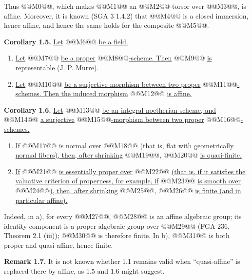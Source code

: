 Thus @@M0@@, which makes @@M1@@ an @@M2@@-torsor over @@M3@@, is affine. Moreover, it is known (SGA 3 1.4.2) that @@M4@@ is a closed immersion, hence affine, and hence the same holds for the composite @@M5@@.

\textbf{Corollary 1.5.} \uline{Let} @@M6@@ \uline{be a field.}
\begin{enumerate}[label=\alph*)]
\item \uline{Let} @@M7@@ \uline{be a proper} @@M8@@\uline{-scheme. Then} @@M9@@ \uline{is representable} (J. P. Murre).
\item \uline{Let} @@M10@@ \uline{be a surjective morphism between two proper} @@M11@@\uline{-schemes. Then the induced morphism} @@M12@@ \uline{is affine.}
\end{enumerate}

\textbf{Corollary 1.6.} \uline{Let} @@M13@@ \uline{be an integral noetherian scheme, and} @@M14@@ \uline{a surjective} @@M15@@\uline{-morphism between two proper} @@M16@@\uline{-schemes.}
\begin{enumerate}[label=\alph*)]
\item \uline{If} @@M17@@ \uline{is normal over} @@M18@@ \uline{(that is, flat with geometrically normal fibers), then, after shrinking} @@M19@@, @@M20@@ \uline{is quasi-finite.}
\item \uline{If} @@M21@@ \uline{is essentially proper over} @@M22@@ \uline{(that is, if it satisfies the valuative criterion of properness, for example, if} @@M23@@ \uline{is smooth over} @@M24@@\uline{), then, after shrinking} @@M25@@, @@M26@@ \uline{is finite (and in particular affine).}
\end{enumerate}

Indeed, in a), for every @@M27@@, @@M28@@ is an affine algebraic group; its identity component is a proper algebraic group over @@M29@@ (FGA 236, Theorem 2.1 (iii)); @@M30@@ is therefore finite. In b), @@M31@@ is both proper and quasi-affine, hence finite.

\textbf{Remark 1.7.} It is not known whether 1.1 remains valid when ``quasi-affine'' is replaced there by affine, as 1.5 and 1.6 might suggest.


